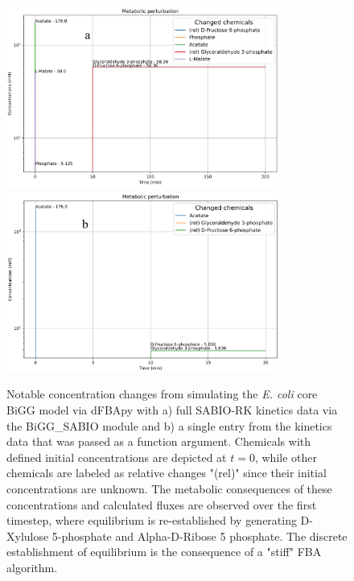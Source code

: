 \begin{figure}
    \centering
    \includegraphics[width = 0.8\textwidth]{images/WCMpy/SABIO_dfba.png} \\ \midrule
    \includegraphics[width = 0.8\textwidth]{images/WCMpy/simple_argument.png}
    \caption{
        Notable concentration changes from simulating the \textit{E. coli} core BiGG model via dFBApy with a) full SABIO-RK kinetics data via the BiGG\_SABIO module and b) a single entry from the kinetics data that was passed as a function argument. Chemicals with defined initial concentrations are depicted at $t=0$, while other chemicals are labeled as relative changes "(rel)" since their initial concentrations are unknown. The metabolic consequences of these concentrations and calculated fluxes are observed over the first timestep, where equilibrium is re-established by generating D-Xylulose 5-phosphate and Alpha-D-Ribose 5 phosphate. The discrete establishment of equilibrium is the consequence of a "stiff" FBA algorithm. 
    }
    \label{dfba}
\end{figure}

